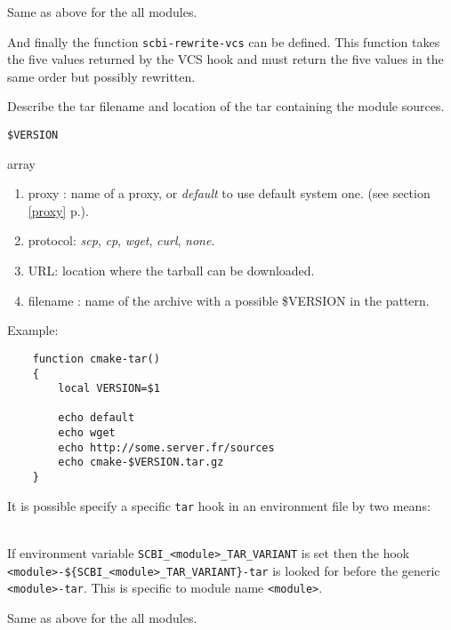 \documentclass[a4paper,12pt,twoside]{article}
\newcommand{\code}[1]{\texttt{#1}}
\renewcommand{\emph}[1]{\textit{#1}}
\newcommand{\seeref}[1]{see section \ref{#1} p.\pageref{#1}}
\begin{document}
\begin{description}[font=\large\texttt]
\begin{description}[style=standard]
		\item[\code{SCBI\_VCS\_VARIANT}] Same as above for the all modules.
	\end{description}

	And finally the function \code{scbi-rewrite-vcs} can be defined. This function takes the five values returned by the VCS hook and must return the five values in the same order but possibly rewritten.

	\item[<module>-tar] Describe the tar filename and location of the tar containing the module sources.
	\begin{description}[font=\textit,style=standard]
		\item[parameter] \tabto{2cm} \code{\$VERSION}
		\item[return] \tabto{2cm} array
		\begin{enumerate}
		\item proxy : name of a proxy, or \emph{default} to use default system one. (\seeref{proxy}).
		\item protocol: \emph{scp}, \emph{cp}, \emph{wget}, \emph{curl}, \emph{none}.
		\item URL: location where the tarball can be downloaded.
		\item filename : name of the archive with a possible \$VERSION in the pattern.
		\end{enumerate}
	\end{description}

	Example:
	\begin{lstlisting}
	function cmake-tar()
	{
		local VERSION=$1

		echo default
		echo wget
		echo http://some.server.fr/sources
		echo cmake-$VERSION.tar.gz
	}
	\end{lstlisting}

	It is possible specify a specific \code{tar} hook in an environment file by two means:

	\begin{description}[style=standard]
		\item[\code{SCBI\_<module>\_TAR\_VARIANT}] \hfill \\
		If environment variable \code{SCBI\_<module>\_TAR\_VARIANT} is set then the hook \\ \code{<module>-\$\{SCBI\_<module>\_TAR\_VARIANT\}-tar} is looked for before the generic \code{<module>-tar}. This is specific to module name \code{<module>}.

		\item[\code{SCBI\_TAR\_VARIANT}] Same as above for the all modules.
	\end{description}


\end{description}
\end{document}
